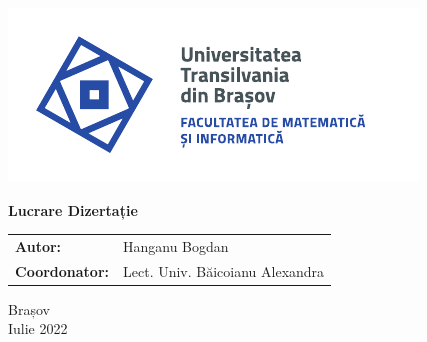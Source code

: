 \begin{titlepage}
	
	\vspace*{-3cm}
	\hspace{-2cm}
	\includegraphics[width=0.8\linewidth]{./images/Logo-UT-MI-SPOT-RO}

	\begin{center}
		\Huge
		
		\vspace{2cm}
		
		\textbf{Lucrare Dizertație}
		
		\vfill
				
		\Large
		\begin{tabular}{ll}
			\textbf{Autor:}&Hanganu Bogdan\\
			\textbf{Coordonator:}&Lect. Univ. Băicoianu Alexandra
		\end{tabular}
		
		\vfill
		
		\Large
		Brașov\\
		Iulie 2022
        
	\end{center}
\end{titlepage}